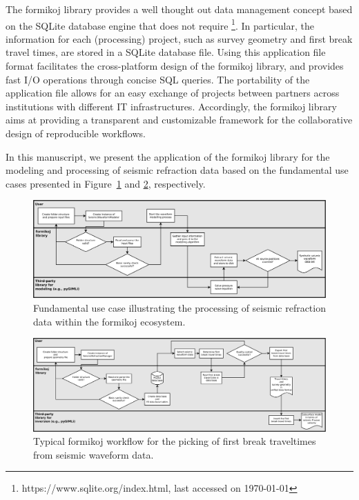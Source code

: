 \documentclass[a4paper,fleqn]{cas-sc}
\begin{document}
The formikoj library provides a well thought out data management concept based on the SQLite database engine that does not require \footnote{https://www.sqlite.org/index.html, last accessed on \today}. In particular, the information for each (processing) project, such as survey geometry and first break travel times, are stored in a SQLite database file. Using this application file format facilitates the cross-platform design of the formikoj library, and provides fast I/O operations through concise SQL queries. The portability of the application file allows for an easy exchange of projects between partners across institutions with different IT infrastructures. Accordingly, the formikoj library aims at providing a transparent and customizable framework for the collaborative design of reproducible workflows.

In this manuscript, we present the application of the formikoj library for the modeling and processing of seismic refraction data based on the fundamental use cases presented in Figure~\ref{fig:modworkflow} and \ref{fig:procworkflow}, respectively.
\begin{figure}
	\centering
	\includegraphics[width=\textwidth]{figures/workflow_modeling-crop.pdf}
	\caption{Fundamental use case illustrating the processing of seismic refraction data within the formikoj ecosystem.}
	\label{fig:modworkflow}
\end{figure}
\begin{figure}
	\centering
	\includegraphics[width=\textwidth]{figures/workflow_processing-crop.pdf}
	\caption{Typical formikoj workflow for the picking of first break traveltimes from seismic waveform data.}
	\label{fig:procworkflow}
\end{figure}
\end{document}
